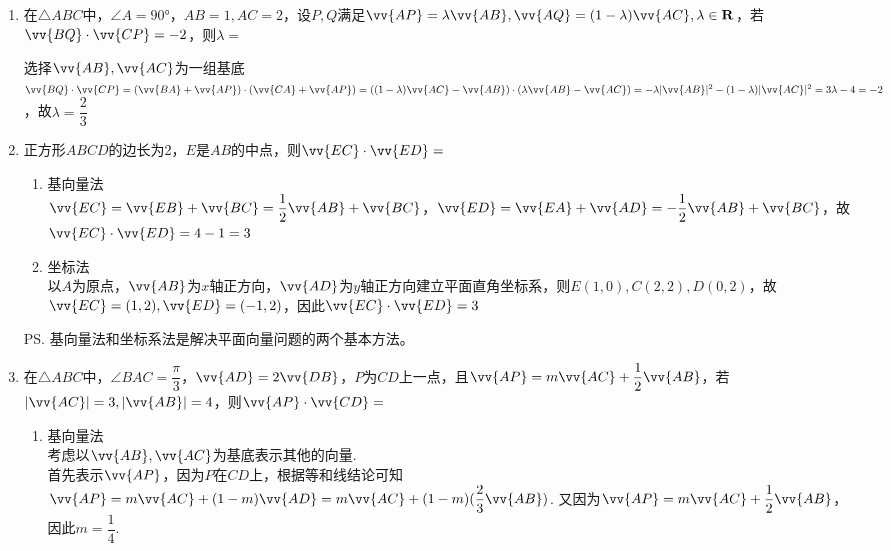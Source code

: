 \begin{enumerate}
\begin{enumerate}
        \item 在$\triangle ABC$中，$\angle A = \ang{90}$，$AB = 1, AC = 2$，设$P, Q$满足$\vv{AP} = \lambda \vv{AB}, \vv{AQ} = (1-\lambda)\vv{AC}, \lambda \in \mathbf{R}$，若$\vv{BQ} \cdot \vv{CP} = -2$，则$\lambda = $ 
        \begin{jieda}
            选择$\vv{AB}, \vv{AC}$为一组基底 \\
            $\vv{BQ} \cdot \vv{CP} = (\vv{BA} + \vv{AP}) \cdot (\vv{CA} + \vv{AP}) = ((1-\lambda)\vv{AC} - \vv{AB}) \cdot (\lambda \vv{AB} - \vv{AC}) = -\lambda|\vv{AB}|^2 - (1-\lambda)|\vv{AC}|^2 = 3\lambda - 4 = -2$，故$\lambda = \dfrac{2}{3}$
        \end{jieda}
        \item 正方形$ABCD$的边长为2，$E$是$AB$的中点，则$\vv{EC} \cdot \vv{ED} = $
        \begin{jieda}
            \begin{enumerate}
                \item 基向量法 \\
                $\vv{EC} = \vv{EB} + \vv{BC} = \dfrac{1}{2} \vv{AB} + \vv{BC}$，$\vv{ED} = \vv{EA} + \vv{AD} = -\dfrac{1}{2}\vv{AB} + \vv{BC}$，故$\vv{EC} \cdot \vv{ED} = 4 - 1 = 3$
                \item 坐标法 \\
                以$A$为原点，$\vv{AB}$为$x$轴正方向，$\vv{AD}$为$y$轴正方向建立平面直角坐标系，则$E(1, 0), C(2, 2), D(0, 2)$，故$\vv{EC} = (1, 2), \vv{ED} = (-1, 2)$，因此$\vv{EC} \cdot \vv{ED} = 3$
            \end{enumerate}
            \ps 基向量法和坐标系法是解决平面向量问题的两个基本方法。
        \end{jieda}
        \item 在$\triangle ABC$中，$\angle BAC = \dfrac{\pi}{3}$，$\vv{AD} = 2\vv{DB}$，$P$为$CD$上一点，且$\vv{AP} = m\vv{AC} + \dfrac{1}{2}\vv{AB}$，若$|\vv{AC}| = 3, |\vv{AB}| = 4$，则$\vv{AP} \cdot \vv{CD} = $
        \begin{jieda}
            \begin{enumerate}
                \item 基向量法 \\
                    考虑以$\vv{AB}, \vv{AC}$为基底表示其他的向量. \\
                    首先表示$\vv{AP}$，因为$P$在$CD$上，根据等和线结论可知$\vv{AP} = m \vv{AC} + (1 - m)\vv{AD} = m \vv{AC} + (1 - m)(\dfrac{2}{3}\vv{AB})$. 又因为$\vv{AP} = m \vv{AC} + \dfrac{1}{2}\vv{AB}$，因此$m = \dfrac{1}{4}$. \\

\end{enumerate}
\end{jieda}
\end{enumerate}
\end{enumerate}
